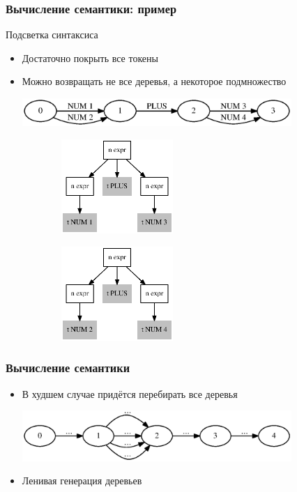 \documentclass{beamer}
\begin{document}
\begin{frame}[fragile]
	\transwipe[direction=90]
	\frametitle{Вычисление семантики: пример}
    Подсветка синтаксиса
    \begin{itemize}
        \item Достаточно покрыть все токены
        \item Можно возвращать не все деревья, а некоторое подмножество
        \begin{center}
            \includegraphics[width=290pt]{picts/idea1_input.eps}
        \end{center}
    \end{itemize}
    \begin{figure}[h]
        \begin{subfigure}[h]{0.33\textwidth}
            \includegraphics[width=120pt]{picts/idea1_tree1_light.eps}
        \end{subfigure}
        \qquad \qquad
        \begin{subfigure}[h]{0.33\textwidth}
            \includegraphics[width=120pt]{picts/idea1_tree2_light.eps}
        \end{subfigure}
    \end{figure}
    
\end{frame}

\begin{frame}[fragile]
	\transwipe[direction=90]
	\frametitle{Вычисление семантики}
    \begin{itemize}
        \item В худшем случае придётся перебирать все деревья
        \begin{center}
            \includegraphics[width=290pt]{picts/Bad_case.eps}
        \end{center}
        \item Ленивая генерация деревьев
    \end{itemize}
\end{frame}
\end{document}

